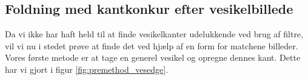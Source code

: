 % 
% 
% 

\subsection{Foldning med kantkonkur efter vesikelbillede}
Da vi ikke har haft held til at finde vesikelkanter udelukkende ved brug af filtre, vil vi nu i stedet prøve at finde det ved hjælp af en form for matchene billeder. Vores første metode er at tage en generel vesikel og opregne dennes kant. Dette har vi gjort i figur \ref{fig:premethod_vesedge}. 

